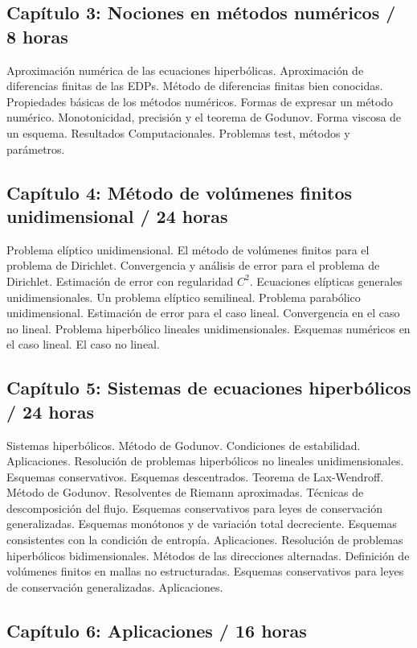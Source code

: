 \subsection*{Capítulo 3: Nociones en métodos numéricos / 8 horas}

Aproximación numérica de las ecuaciones hiperbólicas.
Aproximación de diferencias finitas de las EDPs.
Método de diferencias finitas bien conocidas.
Propiedades básicas de los métodos numéricos.
Formas de expresar un método numérico.
Monotonicidad, precisión y el teorema de Godunov.
Forma viscosa de un esquema.
Resultados Computacionales.
Problemas test, métodos y parámetros.

\subsection*{Capítulo 4: Método de volúmenes finitos unidimensional / 24 horas}

Problema elíptico unidimensional.
El método de volúmenes finitos para el problema de Dirichlet.
Convergencia y análisis de error para el problema de Dirichlet.
Estimación de error con regularidad $C^{2}$.
Ecuaciones elípticas generales unidimensionales.
Un problema elíptico semilineal.
Problema parabólico unidimensional.
Estimación de error para el caso lineal.
Convergencia en el caso no lineal.
Problema hiperbólico lineales unidimensionales.
Esquemas numéricos en el caso lineal.
El caso no lineal.

\subsection*{Capítulo 5: Sistemas de ecuaciones hiperbólicos  / 24 horas}

Sistemas hiperbólicos.
Método de Godunov.
Condiciones de estabilidad.
Aplicaciones.
Resolución de problemas hiperbólicos no lineales unidimensionales.
Esquemas conservativos.
Esquemas descentrados.
Teorema de Lax-Wendroff.
Método de Godunov.
Resolventes de Riemann aproximadas.
Técnicas de descomposición del flujo.
Esquemas conservativos para leyes de conservación generalizadas.
Esquemas monótonos y de variación total decreciente.
Esquemas consistentes con la condición de entropía.
Aplicaciones.
Resolución de problemas hiperbólicos bidimensionales.
Métodos de las direcciones alternadas.
Definición de volúmenes finitos en mallas no estructuradas.
Esquemas conservativos para leyes de conservación generalizadas.
Aplicaciones.

\subsection*{Capítulo 6: Aplicaciones / 16 horas}

